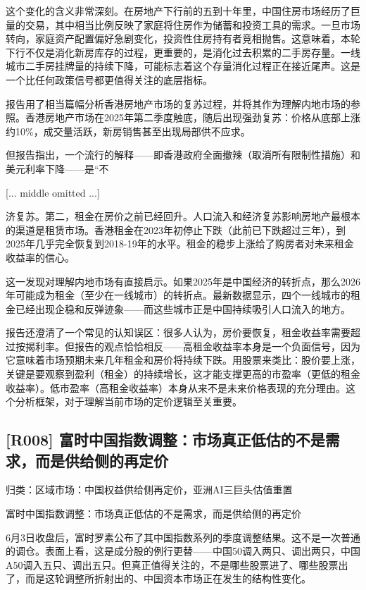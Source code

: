 \documentclass[11pt]{ctexart}
\begin{document}
这个变化的含义非常深刻。在房地产下行前的五到十年里，中国住房市场经历了巨量的交易，其中相当比例反映了家庭将住房作为储蓄和投资工具的需求。一旦市场转向，家庭资产配置偏好急剧变化，投资性住房持有者竞相抛售。这意味着，本轮下行不仅是消化新房库存的过程，更重要的，是消化过去积累的二手房存量。一线城市二手房挂牌量的持续下降，可能标志着这个存量消化过程正在接近尾声。这是一个比任何政策信号都更值得关注的底层指标。

报告用了相当篇幅分析香港房地产市场的复苏过程，并将其作为理解内地市场的参照。香港房地产市场在2025年第二季度触底，随后出现强劲复苏：价格从底部上涨约10\%，成交量活跃，新房销售甚至出现局部供不应求。

但报告指出，一个流行的解释——即香港政府全面撤辣（取消所有限制性措施）和美元利率下降——是“不

[... middle omitted ...]

济复苏。第二，租金在房价之前已经回升。人口流入和经济复苏影响房地产最根本的渠道是租赁市场。香港租金在2023年初停止下跌（此前已下跌超过三年），到2025年几乎完全恢复到2018-19年的水平。租金的稳步上涨给了购房者对未来租金收益率的信心。

这一发现对理解内地市场有直接启示。如果2025年是中国经济的转折点，那么2026年可能成为租金（至少在一线城市）的转折点。最新数据显示，四个一线城市的租金已经出现企稳和反弹迹象——而这些城市正是中国持续吸引人口流入的地方。

报告还澄清了一个常见的认知误区：很多人认为，房价要恢复，租金收益率需要超过按揭利率。但报告的观点恰恰相反——高租金收益率本身是一个负面信号，因为它意味着市场预期未来几年租金和房价将持续下跌。用股票来类比：股价要上涨，关键是要观察到盈利（租金）的持续增长，这才能支撑更高的市盈率（更低的租金收益率）。低市盈率（高租金收益率）本身从来不是未来价格表现的充分理由。这个分析框架，对于理解当前市场的定价逻辑至关重要。

\subsection{[R008] 富时中国指数调整：市场真正低估的不是需求，而是供给侧的再定价}
{\small\color{refgray}归类：区域市场：中国权益供给侧再定价，亚洲AI三巨头估值重置}

富时中国指数调整：市场真正低估的不是需求，而是供给侧的再定价

6月3日收盘后，富时罗素公布了其中国指数系列的季度调整结果。这不是一次普通的调仓。表面上看，这是成分股的例行更替——中国50调入两只、调出两只，中国A50调入五只、调出五只。但真正值得关注的，不是哪些股票进了、哪些股票出了，而是这轮调整所折射出的、中国资本市场正在发生的结构性变化。
\end{document}
